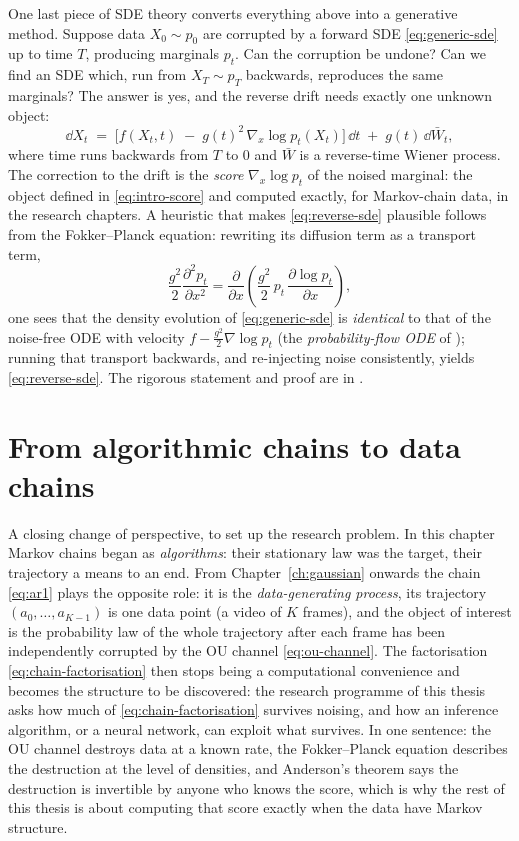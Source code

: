 One last piece of SDE theory converts everything above into a generative
method. Suppose data $X_0 \sim p_0$ are corrupted by a forward SDE
\eqref{eq:generic-sde} up to time $T$, producing marginals $p_t$. Can the
corruption be undone? Can we find an SDE which, run from $X_T \sim p_T$
backwards, reproduces the same marginals? The answer
\citep{anderson1982reverse} is yes, and the reverse drift needs exactly
one unknown object:
\begin{equation}
  \dd X_t \;=\;
  \Big[ f(X_t, t) \;-\; g(t)^2\, \nabla_x \log p_t(X_t) \Big]\,\dd t
  \;+\; g(t)\, \dd \bar W_t ,
  \label{eq:reverse-sde}
\end{equation}
where time runs backwards from $T$ to $0$ and $\bar W$ is a reverse-time
Wiener process. The correction to the drift is the \emph{score}
$\nabla_x \log p_t$ of the noised marginal: the object defined in
\eqref{eq:intro-score} and computed exactly, for Markov-chain data, in
the research chapters. A heuristic that makes \eqref{eq:reverse-sde}
plausible follows from the Fokker--Planck equation: rewriting its
diffusion term as a transport term,
\begin{equation*}
  \frac{g^2}{2} \frac{\partial^2 p_t}{\partial x^2}
  = \frac{\partial}{\partial x}\!\left(
      \frac{g^2}{2}\, p_t\, \frac{\partial \log p_t}{\partial x}
    \right),
\end{equation*}
one sees that the density evolution of \eqref{eq:generic-sde} is
\emph{identical} to that of the noise-free ODE with velocity
$f - \tfrac{g^2}{2} \nabla \log p_t$ (the \emph{probability-flow ODE} of
\citealp{song2021scorebased}); running that transport backwards, and
re-injecting noise consistently, yields \eqref{eq:reverse-sde}. The
rigorous statement and proof are in \citet{anderson1982reverse}.

\section{From algorithmic chains to data chains}

A closing change of perspective, to set up the research problem. In this
chapter Markov chains began as \emph{algorithms}: their stationary law
was the target, their trajectory a means to an end. From
Chapter~\ref{ch:gaussian} onwards the chain \eqref{eq:ar1} plays the
opposite role: it is the \emph{data-generating process}, its trajectory
$(a_0, \dots, a_{K-1})$ is one data point (a video of $K$ frames), and
the object of interest is the probability law of the whole trajectory
after each frame has been independently corrupted by the OU channel
\eqref{eq:ou-channel}. The factorisation \eqref{eq:chain-factorisation}
then stops being a computational convenience and becomes the structure to
be discovered: the research programme of this thesis asks how much of
\eqref{eq:chain-factorisation} survives noising, and how an inference
algorithm, or a neural network, can exploit what survives. In one
sentence: the OU channel destroys data at a known rate, the
Fokker--Planck equation describes the destruction at the level of
densities, and Anderson's theorem says the destruction is invertible by
anyone who knows the score, which is why the rest of this thesis is about
computing that score exactly when the data have Markov structure.

